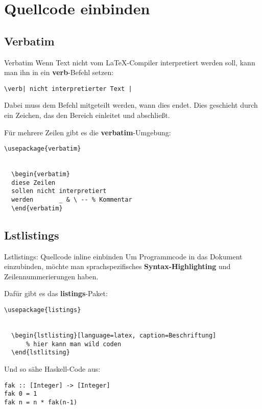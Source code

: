 \section{Quellcode einbinden}

\subsection{Verbatim}
\begin{frame}[fragile]{Verbatim}
Wenn Text nicht vom \LaTeX-Compiler interpretiert werden soll, kann man ihn in ein \textbf{verb}-Befehl setzen:

\begin{lstlisting}[style=tex]
\verb| nicht interpretierter Text |
\end{lstlisting}
Dabei muss dem Befehl mitgeteilt werden, wann dies endet. Dies geschieht durch ein Zeichen, das den Bereich einleitet und abschließt.

\pause\vspace{2ex}
Für mehrere Zeilen gibt es die \textbf{verbatim}-Umgebung:

\begin{lstlisting}[style=tex]
\usepackage{verbatim}


  \begin{verbatim}
  diese Zeilen
  sollen nicht interpretiert
  werden       _ & \ -- % Kommentar
  \end{verbatim}

\end{lstlisting}
\end{frame}

\subsection{Lstlistings}
\begin{frame}[fragile]{Lstlistings: Quellcode inline einbinden}
Um Programmcode in das Dokument einzubinden, möchte man sprachspezifisches \textbf{Syntax-Highlighting} und Zeilennummerierungen haben.

\pause\vspace{2ex}
Dafür gibt es das \textbf{listings}-Paket:

\begin{lstlisting}[style=tex]
\usepackage{listings}


  \begin{lstlisting}[language=latex, caption=Beschriftung]
      % hier kann man wild coden
  \end{lstlitsing}
\end{lstlisting}

Und so sähe Haskell-Code aus:
\begin{lstlisting}[style=hs, caption= Fakultät in Haskell]
fak :: [Integer] -> [Integer]
fak 0 = 1
fak n = n * fak(n-1)
\end{lstlisting}

\end{frame}

